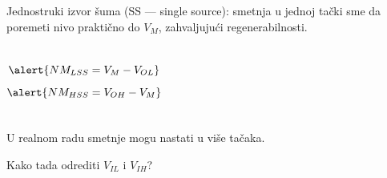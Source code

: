 \begin{frame}[label=08-s022]
Jednostruki izvor šuma (SS — single source): smetnja u jednoj tački sme da poremeti nivo praktično do $V_M$, zahvaljujući regenerabilnosti.\par\medskip
\begin{columns}[c,onlytextwidth]
\[\alert{NM_{LSS}=V_M-V_{OL}}\]
\[\alert{NM_{HSS}=V_{OH}-V_M}\]
\end{columns}\bigskip
U realnom radu smetnje mogu nastati u više tačaka.\par\medskip
Kako tada odrediti $V_{IL}$ i $V_{IH}$?
\end{frame}
